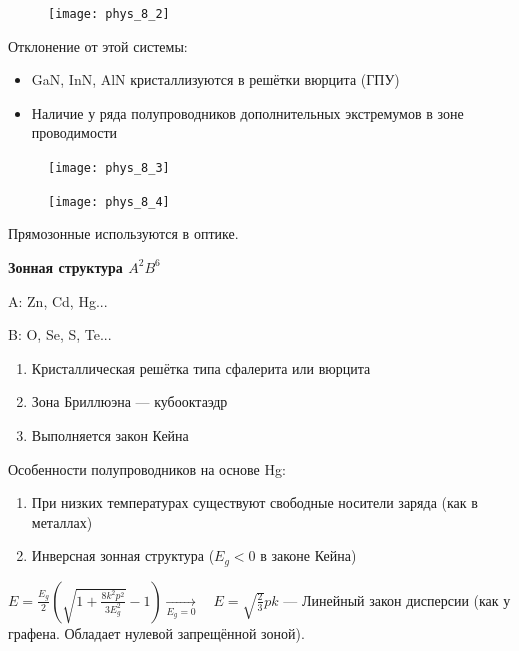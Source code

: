 \begin{figure}[h!]
    \centering
    \texttt{[image: phys\_8\_2]}
\end{figure}

Отклонение от этой системы:

\begin{itemize}
    \item GaN, InN, AlN кристаллизуются в решётки вюрцита (ГПУ)
    \item Наличие у ряда полупроводников дополнительных экстремумов в зоне проводимости
\end{itemize}

\begin{figure}[h!]
    \centering
    \texttt{[image: phys\_8\_3]}
\end{figure}

\begin{figure}[h!]
    \centering
    \texttt{[image: phys\_8\_4]}
\end{figure}

Прямозонные используются в оптике.


\textbf{Зонная структура $A^2B^6$}

A: Zn, Cd, Hg...

B: O, Se, S, Te...

\begin{enumerate}
    \item Кристаллическая решётка типа сфалерита или вюрцита
    \item Зона Бриллюэна --- кубооктаэдр
    \item Выполняется закон Кейна
\end{enumerate}

Особенности полупроводников на основе Hg:

\begin{enumerate}
    \item При низких температурах существуют свободные носители заряда (как в металлах)
    \item Инверсная зонная структура ($E_g<0$ в законе Кейна)
\end{enumerate}

\begin{figure}[h!]
    \centering
\end{figure}


$\displaystyle E=\frac{E_g}{2}\left(\sqrt{1+\frac{8 k^2 p^2}{3 E_g^2}}-1\right) \underset{E_g=0}{\longrightarrow} \quad E=\sqrt{\frac{2}{3}} pk$ --- Линейный закон дисперсии (как у графена. Обладает нулевой запрещённой зоной).

